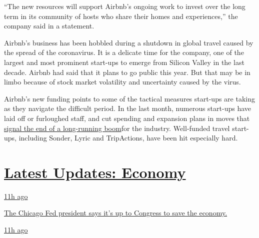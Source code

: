 ``The new resources will support Airbnb's ongoing work to invest over
the long term in its community of hosts who share their homes and
experiences,'' the company said in a statement.

Airbnb's business has been hobbled during a shutdown in global travel
caused by the spread of the coronavirus. It is a delicate time for the
company, one of the largest and most prominent start-ups to emerge from
Silicon Valley in the last decade. Airbnb had said that it plans to go
public this year. But that may be in limbo because of stock market
volatility and uncertainty caused by the virus.

Airbnb's new funding points to some of the tactical measures start-ups
are taking as they navigate the difficult period. In the last month,
numerous start-ups have laid off or furloughed staff, and cut spending
and expansion plans in moves that
\href{https://www.nytimes3xbfgragh.onion/2020/04/01/technology/virus-start-ups-pummeled-layoffs-unwinding.html}{signal
the end of a long-running boom}for the industry. Well-funded travel
start-ups, including Sonder, Lyric and TripActions, have been hit
especially hard.

\hypertarget{latest-updates-economy}{%
\section{\texorpdfstring{\href{https://www.nytimes3xbfgragh.onion/live/2020/08/03/business/stock-market-today-coronavirus?action=click\&pgtype=Article\&state=default\&region=MAIN_CONTENT_1\&context=storylines_live_updates}{Latest
Updates:
Economy}}{Latest Updates: Economy}}\label{latest-updates-economy}}

\href{https://www.nytimes3xbfgragh.onion/live/2020/08/03/business/stock-market-today-coronavirus?action=click\&pgtype=Article\&state=default\&region=MAIN_CONTENT_1\&context=storylines_live_updates\#the-chicago-fed-president-says-its-up-to-congress-to-save-the-economy}{11h
ago}

\href{https://www.nytimes3xbfgragh.onion/live/2020/08/03/business/stock-market-today-coronavirus?action=click\&pgtype=Article\&state=default\&region=MAIN_CONTENT_1\&context=storylines_live_updates\#the-chicago-fed-president-says-its-up-to-congress-to-save-the-economy}{The
Chicago Fed president says it's up to Congress to save the economy.}

\href{https://www.nytimes3xbfgragh.onion/live/2020/08/03/business/stock-market-today-coronavirus?action=click\&pgtype=Article\&state=default\&region=MAIN_CONTENT_1\&context=storylines_live_updates\#faa-says-boeing-has-effectively-mitigated-defects-in-the-737-max}{11h
ago}

